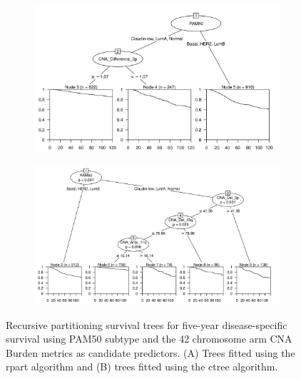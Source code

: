 \begin{figure}[!h]
\centering

\vspace{0.5cm}

\begin{subfigure}{\textwidth}
\subcaption{}
\includegraphics[width=1\textwidth]{../figures/Chapter_3/PA_PartyKit_Survival_Burden_TenYearDSS_PAM50.png}
\end{subfigure}

\vspace{2cm}

\begin{subfigure}{\textwidth}
\subcaption{}
\includegraphics[width=1\textwidth]{../figures/Chapter_3/PA_Ctree_Survival_Burden_TenYearDSS_PAM50.png}
\end{subfigure}

\vspace{0.5cm}

\caption[Recursive partitioning survival trees for five-year disease-specific survival using PAM50 subtype and the 42 chromosome arm CNA Burden metrics as candidate predictors.]{Recursive partitioning survival trees for five-year disease-specific survival using PAM50 subtype and the 42 chromosome arm CNA Burden metrics as candidate predictors. (A) Trees fitted using the rpart algorithm and (B) trees fitted using the ctree algorithm.}
\label{fig:PAM50_PA_CNA_Burden_TenYearDSS}
\end{figure}

